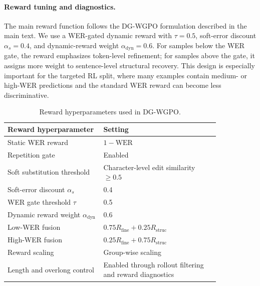 \documentclass{llmxive}
\begin{document}
\paragraph{Reward tuning and diagnostics.}
The main reward function follows the DG-WGPO formulation described in the main
text. We use a WER-gated dynamic reward with $\tau=0.5$, soft-error discount
$\alpha_s=0.4$, and dynamic-reward weight $\alpha_{\mathrm{dyn}}=0.6$. For samples
below the WER gate, the reward emphasizes token-level refinement; for samples
above the gate, it assigns more weight to sentence-level structural recovery.
This design is especially important for the targeted RL split, where many
examples contain medium- or high-WER predictions and the standard WER reward can
become less discriminative.

\begin{table}[t]
\centering
\small
\begin{tabular}{p{0.38\linewidth} p{0.46\linewidth}}
\toprule
\textbf{Reward hyperparameter} & \textbf{Setting} \\
\midrule
Static WER reward
& $1-\mathrm{WER}$ \\

Repetition gate
& Enabled \\

Soft substitution threshold
& Character-level edit similarity $\geq 0.5$ \\

Soft-error discount $\alpha_s$
& 0.4 \\

WER gate threshold $\tau$
& 0.5 \\

Dynamic reward weight $\alpha_{\mathrm{dyn}}$
& 0.6 \\

Low-WER fusion
& $0.75 R_{\mathrm{fine}} + 0.25 R_{\mathrm{struc}}$ \\

High-WER fusion
& $0.25 R_{\mathrm{fine}} + 0.75 R_{\mathrm{struc}}$ \\

Reward scaling
& Group-wise scaling \\

Length and overlong control
& Enabled through rollout filtering and reward diagnostics \\
\bottomrule
\end{tabular}
\vspace{-2mm}
\caption{
Reward hyperparameters used in DG-WGPO.
}
\label{tab:dg_wgpo_reward_hparams}
\end{table}
\end{document}
